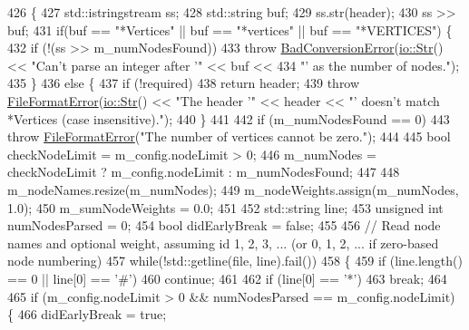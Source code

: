 \begin{DoxyCode}
426 \{
427     std::istringstream ss;
428     std::string buf;
429     ss.str(header);
430     ss >> buf;
431     \textcolor{keywordflow}{if}(buf == \textcolor{stringliteral}{"*Vertices"} || buf == \textcolor{stringliteral}{"*vertices"} || buf == \textcolor{stringliteral}{"*VERTICES"}) \{
432         \textcolor{keywordflow}{if} (!(ss >> m\_numNodesFound))
433             \textcolor{keywordflow}{throw} \mbox{\hyperlink{classBadConversionError}{BadConversionError}}(\mbox{\hyperlink{classio_1_1Str}{io::Str}}() << \textcolor{stringliteral}{"Can't parse an integer after '"}
       << buf <<
434                     \textcolor{stringliteral}{"' as the number of nodes."});
435     \}
436     \textcolor{keywordflow}{else} \{
437         \textcolor{keywordflow}{if} (!required)
438             \textcolor{keywordflow}{return} header;
439         \textcolor{keywordflow}{throw} \mbox{\hyperlink{classFileFormatError}{FileFormatError}}(\mbox{\hyperlink{classio_1_1Str}{io::Str}}() << \textcolor{stringliteral}{"The header '"} << header << \textcolor{stringliteral}{"' doesn't
       match *Vertices (case insensitive)."});
440     \}
441 
442     \textcolor{keywordflow}{if} (m\_numNodesFound == 0)
443         \textcolor{keywordflow}{throw} \mbox{\hyperlink{classFileFormatError}{FileFormatError}}(\textcolor{stringliteral}{"The number of vertices cannot be zero."});
444 
445     \textcolor{keywordtype}{bool} checkNodeLimit = m\_config.nodeLimit > 0;
446     m\_numNodes = checkNodeLimit ? m\_config.nodeLimit : m\_numNodesFound;
447 
448     m\_nodeNames.resize(m\_numNodes);
449     m\_nodeWeights.assign(m\_numNodes, 1.0);
450     m\_sumNodeWeights = 0.0;
451 
452     std::string line;
453     \textcolor{keywordtype}{unsigned} \textcolor{keywordtype}{int} numNodesParsed = 0;
454     \textcolor{keywordtype}{bool} didEarlyBreak = \textcolor{keyword}{false};
455 
456     \textcolor{comment}{// Read node names and optional weight, assuming id 1, 2, 3, ... (or 0, 1, 2, ... if zero-based node
       numbering)}
457     \textcolor{keywordflow}{while}(!std::getline(file, line).fail())
458     \{
459         \textcolor{keywordflow}{if} (line.length() == 0 || line[0] == \textcolor{charliteral}{'#'})
460             \textcolor{keywordflow}{continue};
461 
462         \textcolor{keywordflow}{if} (line[0] == \textcolor{charliteral}{'*'})
463             \textcolor{keywordflow}{break};
464 
465         \textcolor{keywordflow}{if} (m\_config.nodeLimit > 0 && numNodesParsed == m\_config.nodeLimit) \{
466             didEarlyBreak = \textcolor{keyword}{true};

\end{DoxyCode}
